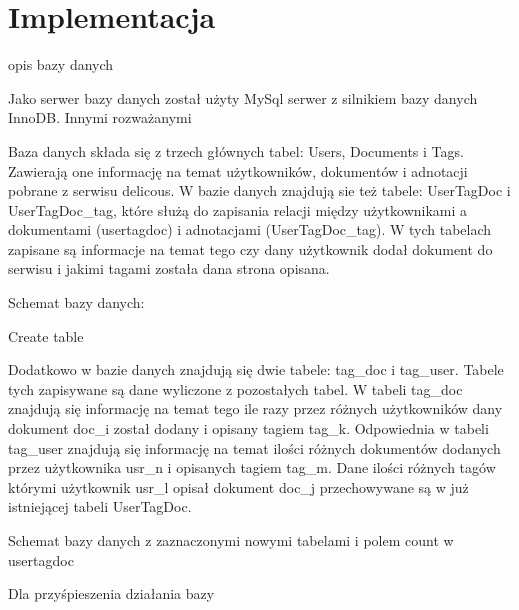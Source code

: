 \chapter{Implementacja}


opis bazy danych

Jako serwer bazy danych został użyty MySql serwer z silnikiem bazy danych InnoDB. Innymi rozważanymi 

Baza danych składa się z trzech głównych tabel: Users, Documents i Tags. Zawierają one informację na temat użytkowników, dokumentów i adnotacji pobrane z serwisu delicous. W bazie danych znajdują sie też tabele: UserTagDoc i UserTagDoc_tag, które służą do zapisania relacji między użytkownikami a dokumentami (usertagdoc) i adnotacjami (UserTagDoc_tag). W tych tabelach zapisane są  informacje na temat tego czy dany użytkownik dodał dokument do serwisu i jakimi tagami została dana strona opisana.

Schemat bazy danych:

Create table


Dodatkowo w bazie danych znajdują się dwie tabele: tag_doc i tag_user. Tabele tych zapisywane są dane wyliczone z pozostałych tabel. W tabeli tag_doc znajdują się informację na temat tego ile razy przez różnych użytkowników dany dokument doc_i  został dodany i opisany tagiem tag_k. Odpowiednia w tabeli tag_user znajdują się informację na temat ilości różnych dokumentów dodanych przez użytkownika usr_n i opisanych tagiem tag_m. Dane ilości różnych tagów którymi użytkownik usr_l opisał dokument doc_j przechowywane są w już istniejącej tabeli UserTagDoc.

Schemat bazy danych z zaznaczonymi nowymi tabelami i polem count w usertagdoc

Dla przyśpieszenia działania bazy

